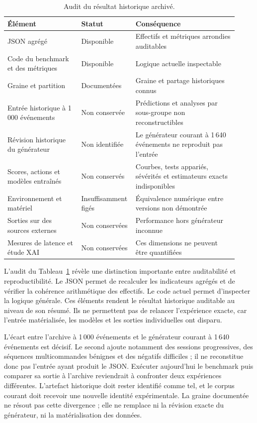 \documentclass[11pt,a4paper,oneside]{report}
\theoremstyle{definition}
\theoremstyle{plain}
\begin{document}
\begin{table}[tb]
  \centering
  \caption{Audit du résultat historique archivé.}
  \label{tab:eval-repro-audit}
  \small
  \begin{tabular}{@{}p{0.31\linewidth}p{0.18\linewidth}p{0.43\linewidth}@{}}
    \toprule
    Élément & Statut & Conséquence \\
    \midrule
    JSON agrégé & Disponible &
    Effectifs et métriques arrondies auditables \\
    Code du benchmark et des métriques & Disponible &
    Logique actuelle inspectable \\
    Graine et partition & Documentées &
    Graine et partage historiques connus \\
    Entrée historique à 1\,000 événements & Non conservée &
    Prédictions et analyses par sous-groupe non reconstructibles \\
    Révision historique du générateur & Non identifiée &
    Le générateur courant à 1\,640 événements ne reproduit pas l'entrée \\
    Scores, actions et modèles entraînés & Non conservés &
    Courbes, tests appariés, sévérités et estimateurs exacts indisponibles \\
    Environnement et matériel & Insuffisamment figés &
    Équivalence numérique entre versions non démontrée \\
    Sorties sur des sources externes & Non conservées &
    Performance hors générateur inconnue \\
    Mesures de latence et étude XAI & Non conservées &
    Ces dimensions ne peuvent être quantifiées \\
    \bottomrule
  \end{tabular}
\end{table}

L'audit du Tableau~\ref{tab:eval-repro-audit} révèle une distinction importante
entre auditabilité et reproductibilité. Le JSON permet de recalculer les
indicateurs agrégés et de vérifier la cohérence arithmétique des effectifs. Le
code actuel permet d'inspecter la logique générale. Ces éléments rendent le
résultat historique auditable au niveau de son résumé. Ils ne permettent pas
de relancer l'expérience exacte, car l'entrée matérialisée, les modèles et les
sorties individuelles ont disparu.

L'écart entre l'archive à 1\,000 événements et le générateur courant à 1\,640
événements est décisif. Le second ajoute notamment des sessions progressives,
des séquences multicommandes bénignes et des négatifs difficiles ; il ne
reconstitue donc pas l'entrée ayant produit le JSON. Exécuter aujourd'hui le
benchmark puis comparer sa sortie à l'archive reviendrait à confronter deux
expériences différentes. L'artefact historique doit rester identifié comme tel,
et le corpus courant doit recevoir une nouvelle identité expérimentale. La
graine documentée ne résout pas cette divergence ; elle ne remplace ni la
révision exacte du générateur, ni la matérialisation des données.
\end{document}
